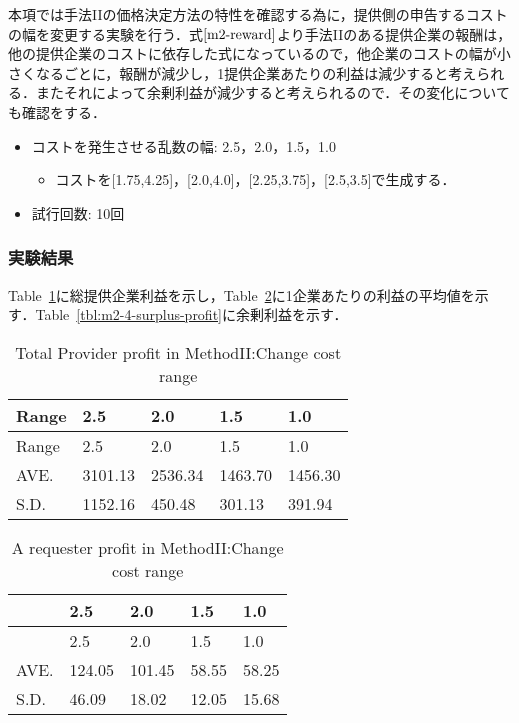 本項では手法IIの価格決定方法の特性を確認する為に，提供側の申告するコストの幅を変更する実験を行う．式\(\eqref{m2-reward}\)より手法IIのある提供企業の報酬は，他の提供企業のコストに依存した式になっているので，他企業のコストの幅が小さくなるごとに，報酬が減少し，1提供企業あたりの利益は減少すると考えられる．またそれによって余剰利益が減少すると考えられるので．その変化についても確認をする．

\begin{itemize}
\tightlist
\item
  コストを発生させる乱数の幅: 2.5，2.0，1.5，1.0

  \begin{itemize}
  \tightlist
  \item
    コストを{[}1.75,4.25{]}，{[}2.0,4.0{]}，{[}2.25,3.75{]}，{[}2.5,3.5{]}で生成する．
  \end{itemize}
\item
  試行回数: 10回
\end{itemize}

\hypertarget{ux5b9fux9a13ux7d50ux679c-6}{%
\subsubsection{実験結果}\label{ux5b9fux9a13ux7d50ux679c-6}}

Table~\ref{tbl:m2-4-total-provider-profit}に総提供企業利益を示し，Table~\ref{tbl:m2-4-provider-profit}に1企業あたりの利益の平均値を示す．Table~\ref{tbl:m2-4-surplus-profit}に余剰利益を示す．

\hypertarget{tbl:m2-4-total-provider-profit}{}
\begin{longtable}[H]{@{}lllll@{}}
\caption{\label{tbl:m2-4-total-provider-profit}Total Provider profit in
MethodII:Change cost range}\tabularnewline
\toprule
Range & 2.5 & 2.0 & 1.5 & 1.0\tabularnewline
\midrule
\endfirsthead
\toprule
Range & 2.5 & 2.0 & 1.5 & 1.0\tabularnewline
\midrule
\endhead
AVE. & 3101.13 & 2536.34 & 1463.70 & 1456.30\tabularnewline
S.D. & 1152.16 & 450.48 & 301.13 & 391.94\tabularnewline
\bottomrule
\end{longtable}

\hypertarget{tbl:m2-4-provider-profit}{}
\begin{longtable}[H]{@{}lllll@{}}
\caption{\label{tbl:m2-4-provider-profit}A requester profit in
MethodII:Change cost range}\tabularnewline
\toprule
& 2.5 & 2.0 & 1.5 & 1.0\tabularnewline
\midrule
\endfirsthead
\toprule
& 2.5 & 2.0 & 1.5 & 1.0\tabularnewline
\midrule
\endhead
AVE. & 124.05 & 101.45 & 58.55 & 58.25\tabularnewline
S.D. & 46.09 & 18.02 & 12.05 & 15.68\tabularnewline
\bottomrule
\end{longtable}

